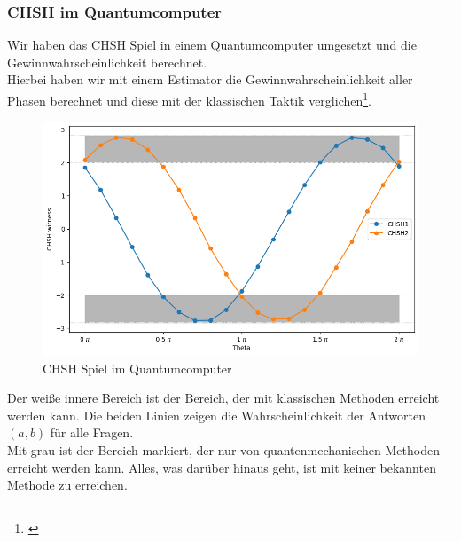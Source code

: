 \subsubsection{CHSH im Quantumcomputer}
\label{subsubsec:chsh_quantumcomputer}
Wir haben das CHSH Spiel in einem Quantumcomputer umgesetzt und die Gewinnwahrscheinlichkeit berechnet.\\
Hierbei haben wir mit einem Estimator die Gewinnwahrscheinlichkeit aller Phasen berechnet und diese mit der klassischen Taktik verglichen\footnote{\cite{IBM_chsh_2025}}.

\begin{figure}[H]
    \centering
    \includegraphics[width=0.8\linewidth]{img/CHSH-Output.png}
    \caption{CHSH Spiel im Quantumcomputer}
    \label{fig:CHSHQuantum}
\end{figure}

Der weiße innere Bereich ist der Bereich, der mit klassischen Methoden erreicht werden kann.
Die beiden Linien zeigen die Wahrscheinlichkeit der Antworten $(a, b)$ für alle Fragen.\\
Mit grau ist der Bereich markiert, der nur von quantenmechanischen Methoden erreicht werden kann. Alles, was darüber hinaus geht, ist mit keiner bekannten Methode zu erreichen.\\
